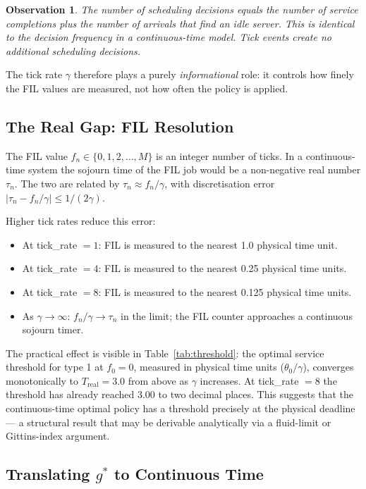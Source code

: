 \documentclass[11pt,a4paper]{article}
\newtheorem{observation}{Observation}
\begin{document}
\begin{observation}
  The number of scheduling decisions equals the number of service completions
  plus the number of arrivals that find an idle server.  This is identical to
  the decision frequency in a continuous-time model.  Tick events create no
  additional scheduling decisions.
\end{observation}

The tick rate $\gamma$ therefore plays a purely \emph{informational} role: it
controls how finely the FIL values are measured, not how often the policy is
applied.

\subsection{The Real Gap: FIL Resolution}

The FIL value $f_n \in \{0, 1, 2, \ldots, M\}$ is an integer number of ticks.
In a continuous-time system the sojourn time of the FIL job would be a
non-negative real number $\tau_n$.  The two are related by
$\tau_n \approx f_n / \gamma$, with discretisation error $|\tau_n - f_n/\gamma|
\leq 1/(2\gamma)$.

Higher tick rates reduce this error:
\begin{itemize}
  \item At tick\_rate $= 1$: FIL is measured to the nearest 1.0 physical
        time unit.
  \item At tick\_rate $= 4$: FIL is measured to the nearest 0.25 physical
        time units.
  \item At tick\_rate $= 8$: FIL is measured to the nearest 0.125 physical
        time units.
  \item As $\gamma \to \infty$: $f_n / \gamma \to \tau_n$ in the limit; the
        FIL counter approaches a continuous sojourn timer.
\end{itemize}

The practical effect is visible in Table~\ref{tab:threshold}: the optimal
service threshold for type 1 at $f_0 = 0$, measured in physical time units
($\theta_0 / \gamma$), converges monotonically to $T_\text{real} = 3.0$ from
above as $\gamma$ increases.  At tick\_rate $= 8$ the threshold has already
reached $3.00$ to two decimal places.  This suggests that the continuous-time
optimal policy has a threshold precisely at the physical deadline --- a
structural result that may be derivable analytically via a fluid-limit or
Gittins-index argument.

\subsection{Translating $g^*$ to Continuous Time}
\end{document}
